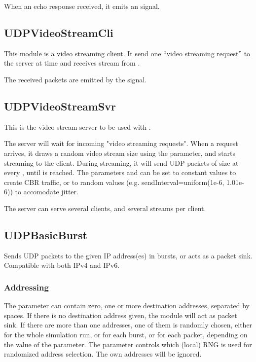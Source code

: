 When an echo response received, it emits an  signal.

\subsection{UDPVideoStreamCli}

This module is a video streaming client. It send one ``video streaming request'' to
the server at time  and receives stream from .

The received packets are emitted by the  signal.

\subsection{UDPVideoStreamSvr}

This is the video stream server to be used with .

The server will wait for incoming "video streaming requests".
When a request arrives, it draws a random video stream size
using the  parameter, and starts streaming to the client.
During streaming, it will send UDP packets of size  at every
, until  is reached. The parameters 
and  can be set to constant values to create CBR traffic,
or to random values (e.g. sendInterval=uniform(1e-6, 1.01e-6)) to
accomodate jitter.

The server can serve several clients, and several streams per client.


\subsection{UDPBasicBurst}

Sends UDP packets to the given IP address(es) in bursts, or acts as a
packet sink. Compatible with both IPv4 and IPv6.

\subsubsection*{Addressing}

The  parameter can contain zero, one or more destination
addresses, separated by spaces. If there is no destination address given,
the module will act as packet sink. If there are more than one addresses,
one of them is randomly chosen, either for the whole simulation run,
or for each burst, or for each packet, depending on the value of the
 parameter. The  parameter controls which
(local) RNG is used for randomized address selection.
The own addresses will be ignored.
 
